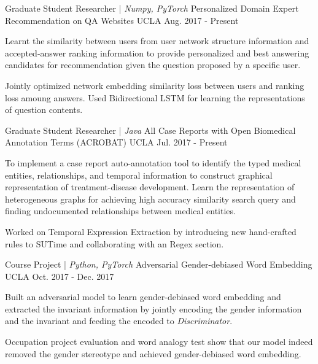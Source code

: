 \begin{cventries}
  \cventry
    {Graduate Student Researcher | \textit{Numpy, PyTorch}}
    {Personalized Domain Expert Recommendation on QA Websites}
    {UCLA}
    {Aug. 2017 - Present}
    {
    	\begin{cvitems}
    		\item {Learnt the similarity between users from user network structure information and accepted-answer ranking information to provide personalized and best answering candidates for recommendation given the question proposed by a specific user.}
    		\item {Jointly optimized network embedding similarity loss between users and ranking loss amoung answers. Used Bidirectional LSTM for learning the representations of question contents.}
    	\end{cvitems}
    }

\vspace{-1em}

  \cventry
    {Graduate Student Researcher | \textit{Java}}
    {All Case Reports with Open Biomedical Annotation Terms (ACROBAT)}
    {UCLA}
    {Jul. 2017 - Present}
    {
    	\begin{cvitems}
			\item {To implement a case report auto-annotation tool to identify the typed medical entities, relationships, and temporal information to construct graphical representation of treatment-disease development. Learn the representation of heterogeneous graphs for achieving high accuracy similarity search query and finding undocumented relationships between medical entities.}
			\item {Worked on Temporal Expression Extraction by introducing new hand-crafted rules to SUTime and collaborating with an Regex section.}
    	\end{cvitems}
    }

\vspace{-1.2em}

\cventry
  {Course Project | \textit{Python, PyTorch}}
  {Adversarial Gender-debiased Word Embedding}
  {UCLA}
  {Oct. 2017 - Dec. 2017}
  {
    \begin{cvitems}
        \item {Built an adversarial model to learn gender-debiased word embedding and extracted the invariant information by jointly encoding the gender information and the invariant and feeding the encoded to 
        \textit{Discriminator}.}
        \item {Occupation project evaluation and word analogy test show that our model indeed removed the gender stereotype and achieved gender-debiased word embedding.}
    \end{cvitems}
  }


\end{cventries}

